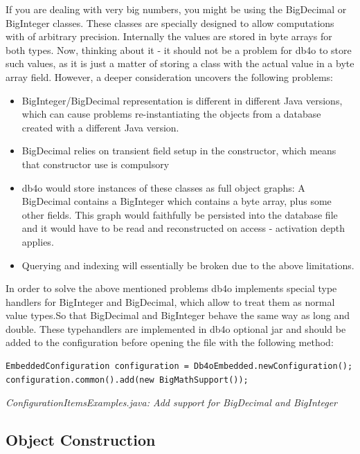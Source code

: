If you are dealing with very big numbers, you might be using the BigDecimal or BigInteger classes. These classes are specially designed to allow computations with of arbitrary precision. Internally the values are stored in byte arrays for both types. Now, thinking about it - it should not be a problem for db4o to store such values, as it is just a matter of storing a class with the actual value in a byte array field. However, a deeper consideration uncovers the following problems:

\begin{itemize}
\item BigInteger/BigDecimal representation is different in different Java versions, which can cause problems re-instantiating the objects from a database created with a different Java version.
\item BigDecimal relies on transient field setup in the constructor, which means that constructor use is compulsory
\item db4o would store instances of these classes as full object graphs: A BigDecimal contains a BigInteger which contains a byte array, plus some other fields. This graph would faithfully be persisted into the database file and it would have to be read and reconstructed on access - activation depth applies.
\item Querying and indexing will essentially be broken due to the above limitations.
\end{itemize}

In order to solve the above mentioned problems db4o implements special type handlers for BigInteger and BigDecimal, which allow to treat them as normal value types.So that BigDecimal and BigInteger behave the same way as long and double. These typehandlers are implemented in db4o optional jar and should be added to the configuration before opening the file with the following method:

\begin{lstlisting}
EmbeddedConfiguration configuration = Db4oEmbedded.newConfiguration();
configuration.common().add(new BigMathSupport());
\end{lstlisting}

{\small\itshape ConfigurationItemsExamples.java: Add support for BigDecimal and BigInteger\par}
\medskip

\subsection{Object Construction}
\label{ref:advanced-topics-type-handling-object-construction}

